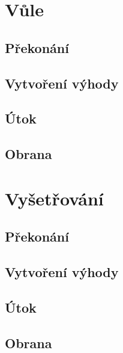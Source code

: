 \documentclass[../main.tex]{subfiles}
\begin{document}
\section{Vůle}
\label{sec:vule}

\subsection*{Překonání}
\label{subsec:vule-prekonani}
\prekonani

\subsection*{Vytvoření výhody}
\label{subsec:vule-vytvoreni}
\vytvoreni

\subsection*{Útok}
\label{subsec:vule-utok}
\utok

\subsection*{Obrana}
\label{subsec:vule-obrana}
\obrana

\section{Vyšetřování}
\label{sec:vysetrovani}

\subsection*{Překonání}
\label{subsec:vysetrovani-prekonani}
\prekonani

\subsection*{Vytvoření výhody}
\label{subsec:vysetrovani-vytvoreni}
\vytvoreni

\subsection*{Útok}
\label{subsec:vysetrovani-utok}
\utok

\subsection*{Obrana}
\label{subsec:vysetrovani-obrana}
\obrana
\end{document}
